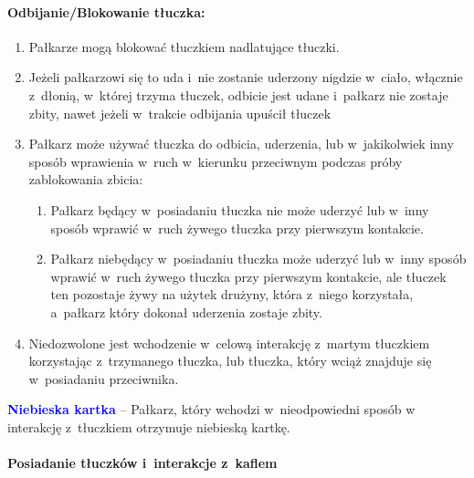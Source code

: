\documentclass[12pt]{article}
\newcommand\bluecard[1]{\bgroup\textcolor{blue}{\textbf{#1}}}
\begin{document}
\paragraph{Odbijanie/Blokowanie tłuczka:}

\begin{enumerate}
	\item
	      Pałkarze mogą blokować tłuczkiem nadlatujące tłuczki.
	\item
	      Jeżeli pałkarzowi się to uda i~nie zostanie uderzony nigdzie w~ciało,
	      włącznie z~dłonią, w~której trzyma tłuczek, odbicie jest udane i~pałkarz nie zostaje zbity, nawet jeżeli w~trakcie odbijania upuścił
	      tłuczek
	\item
	      Pałkarz może używać tłuczka do odbicia, uderzenia, lub w~jakikolwiek
	      inny sposób wprawienia w~ruch w~kierunku przeciwnym podczas próby
	      zablokowania zbicia:

	      \begin{enumerate}
		      \item
		            Pałkarz będący w~posiadaniu tłuczka nie może uderzyć lub w~inny
		            sposób wprawić w~ruch żywego tłuczka przy pierwszym kontakcie.
		      \item
		            Pałkarz niebędący w~posiadaniu tłuczka może uderzyć lub w~inny
		            sposób wprawić w~ruch żywego tłuczka przy pierwszym kontakcie, ale
		            tłuczek ten pozostaje żywy na użytek drużyny, która z~niego
		            korzystała, a~pałkarz który dokonał uderzenia zostaje zbity.
	      \end{enumerate}
	\item
	      Niedozwolone jest wchodzenie w~celową interakcję z~martym tłuczkiem
	      korzystając z~trzymanego tłuczka, lub tłuczka, który wciąż znajduje
	      się w~posiadaniu przeciwnika.
\end{enumerate}

\bluecard{Niebieska kartka} -- Pałkarz, który wchodzi w~nieodpowiedni sposób
w interakcję z~tłuczkiem otrzymuje niebieską kartkę.

\paragraph{Posiadanie tłuczków i~interakcje z~kaflem}
\end{document}
